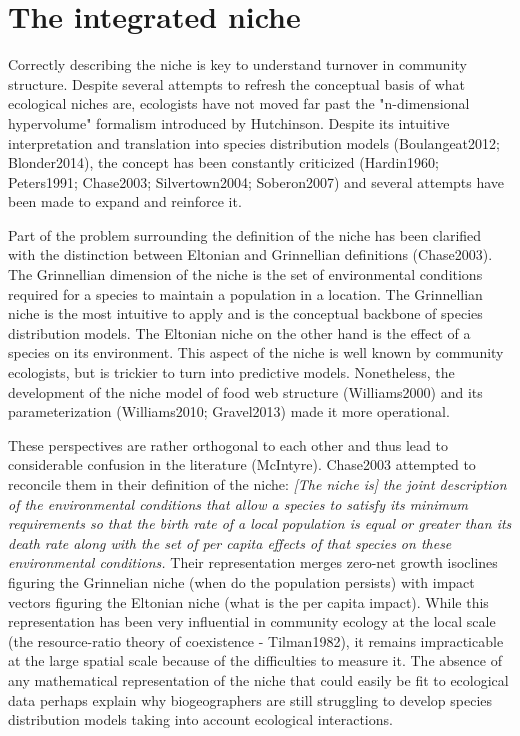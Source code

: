 \documentclass[12pt]{article}
\begin{document}
\section*{The integrated niche}

Correctly describing the niche is key to understand turnover in community
structure. Despite several attempts to refresh the conceptual basis of what
ecological niches are, ecologists have not moved far past the "n-dimensional
hypervolume" formalism introduced by Hutchinson. Despite its
intuitive interpretation and translation into species distribution models
(Boulangeat2012; Blonder2014), the concept has been constantly criticized
(Hardin1960; Peters1991; Chase2003; Silvertown2004; Soberon2007) and several
attempts have been made to expand and reinforce it.

Part of the problem surrounding the definition of the niche has been clarified
with the distinction between Eltonian and Grinnellian definitions (Chase2003).
The Grinnellian dimension of the niche is the set of environmental conditions
required for a species to maintain a population in a location. The Grinnellian
niche is the most intuitive to apply and is the conceptual backbone of species
distribution models. The Eltonian niche on the other hand is the effect of a
species on its environment. This aspect of the niche is well known by
community ecologists, but is trickier to turn into predictive models.
Nonetheless, the development of the niche model of food web structure
(Williams2000) and its parameterization (Williams2010; Gravel2013) made it
more operational.

These perspectives are rather orthogonal to each other and thus lead to
considerable confusion in the literature (McIntyre). Chase2003 attempted to
reconcile them in their definition of the niche: \textit{[The niche is] the
joint description of the environmental conditions that allow a species to
satisfy its minimum requirements so that the birth rate of a local population
is equal or greater than its death rate along with the set of per capita
effects of that species on these environmental conditions.} Their
representation merges zero-net growth isoclines figuring the Grinnelian niche
(when do the population persists) with impact vectors figuring the Eltonian
niche (what is the per capita impact). While this representation has been very
influential in community ecology at the local scale (the resource-ratio theory
of coexistence - Tilman1982), it remains impracticable at the large spatial
scale because of the difficulties to measure it. The absence of any
mathematical representation of the niche that could easily be fit to
ecological data perhaps explain why biogeographers are still struggling to
develop species distribution models taking into account ecological
interactions.
\end{document}
